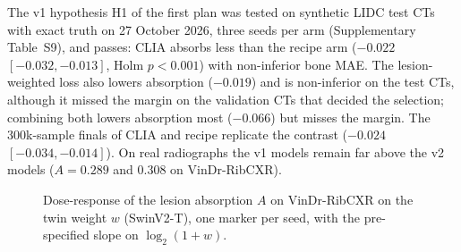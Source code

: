 The v1 hypothesis H1 of the first plan was tested on synthetic LIDC test CTs with exact truth on 27 October 2026, three seeds per arm
(Supplementary Table~S9), and passes: CLIA absorbs less than the recipe arm ($-0.022$ $[-0.032,-0.013]$, Holm $p<0.001$) with non-inferior bone
MAE. The lesion-weighted loss also lowers absorption ($-0.019$) and is non-inferior on the test CTs, although it missed the margin on the
validation CTs that decided the selection; combining both lowers absorption most ($-0.066$) but misses the margin. The 300k-sample finals of
CLIA and recipe replicate the contrast ($-0.024$ $[-0.034,-0.014]$). On real radiographs the v1 models remain far above the v2 models
($A=0.289$ and 0.308 on VinDr-RibCXR).
\begin{table}[htbp]
\centering\small
\caption{Dose-response of the lesion absorption on the twin weight (SwinV2-T family): seeds per weight, mean $A$ on VinDr-RibCXR and on the
Qure-projection test split, and the pre-specified slope with its image-cluster bootstrap interval. Each weight averages all of its seeds
(four at $w=16$, seeds 0--3); the encoder comparisons use seeds 0--2 only.}
\label{tab:dose_response}
\end{table}
\begin{figure}[htbp]
\centering
{}
\caption{Dose-response of the lesion absorption $A$ on VinDr-RibCXR on the twin weight $w$ (SwinV2-T), one marker per seed, with the
pre-specified slope on $\log_2(1+w)$.}
\label{fig:dose_response}
\end{figure}
\begin{table}[htbp]
\centering\small
\caption{Ablation of the twin regulariser at $w=16$ (SwinV2-T, 300k samples, mean over seeds): one factor changed per row. Development
evidence: audit on all 75 SZCH images, bone PSNR$_{cal}$ on the 24 development pairs.}
\label{tab:ablation_twin}
\end{table}

